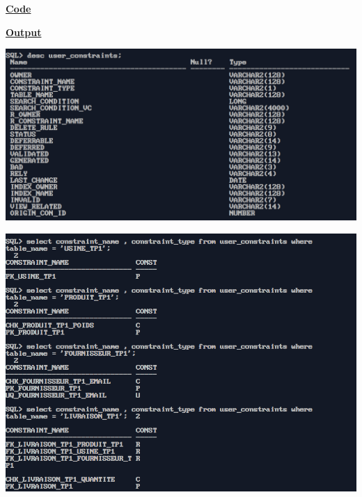 \newpage
{}
\textbf{\underline{Code}}


\vspace{1cm}
\textbf{\underline{Output}}
\vspace{1cm}
\begin{center}
    \includegraphics[height=0.3\textheight]{Questions/q5/desc.png}
    
    \vspace{0.25cm}
    
    \includegraphics[height=0.4\textheight]{Questions/q5/const.png}
\end{center}


